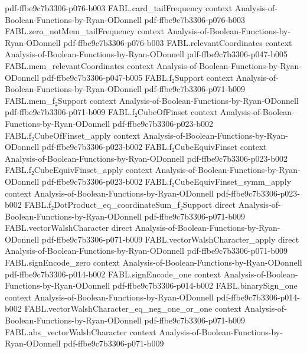 \begin{theorem}
  {pdf-ffbe9c7b3306-p076-b003}
\proofstep
  {FABL.card_tailFrequency}
  {context}
  {Analysis-of-Boolean-Functions-by-Ryan-ODonnell}
  {pdf-ffbe9c7b3306-p076-b003}
\proofstep
  {FABL.zero_notMem_tailFrequency}
  {context}
  {Analysis-of-Boolean-Functions-by-Ryan-ODonnell}
  {pdf-ffbe9c7b3306-p076-b003}
\proofstep
  {FABL.relevantCoordinates}
  {context}
  {Analysis-of-Boolean-Functions-by-Ryan-ODonnell}
  {pdf-ffbe9c7b3306-p047-b005}
\proofstep
  {FABL.mem_relevantCoordinates}
  {context}
  {Analysis-of-Boolean-Functions-by-Ryan-ODonnell}
  {pdf-ffbe9c7b3306-p047-b005}
\proofstep
  {FABL.f₂Support}
  {context}
  {Analysis-of-Boolean-Functions-by-Ryan-ODonnell}
  {pdf-ffbe9c7b3306-p071-b009}
\proofstep
  {FABL.mem_f₂Support}
  {context}
  {Analysis-of-Boolean-Functions-by-Ryan-ODonnell}
  {pdf-ffbe9c7b3306-p071-b009}
\proofstep
  {FABL.f₂CubeOfFinset}
  {context}
  {Analysis-of-Boolean-Functions-by-Ryan-ODonnell}
  {pdf-ffbe9c7b3306-p023-b002}
\proofstep
  {FABL.f₂CubeOfFinset_apply}
  {context}
  {Analysis-of-Boolean-Functions-by-Ryan-ODonnell}
  {pdf-ffbe9c7b3306-p023-b002}
\proofstep
  {FABL.f₂CubeEquivFinset}
  {context}
  {Analysis-of-Boolean-Functions-by-Ryan-ODonnell}
  {pdf-ffbe9c7b3306-p023-b002}
\proofstep
  {FABL.f₂CubeEquivFinset_apply}
  {context}
  {Analysis-of-Boolean-Functions-by-Ryan-ODonnell}
  {pdf-ffbe9c7b3306-p023-b002}
\proofstep
  {FABL.f₂CubeEquivFinset_symm_apply}
  {context}
  {Analysis-of-Boolean-Functions-by-Ryan-ODonnell}
  {pdf-ffbe9c7b3306-p023-b002}
\proofstep
  {FABL.f₂DotProduct_eq_coordinateSum_f₂Support}
  {direct}
  {Analysis-of-Boolean-Functions-by-Ryan-ODonnell}
  {pdf-ffbe9c7b3306-p071-b009}
\proofstep
  {FABL.vectorWalshCharacter}
  {direct}
  {Analysis-of-Boolean-Functions-by-Ryan-ODonnell}
  {pdf-ffbe9c7b3306-p071-b009}
\proofstep
  {FABL.vectorWalshCharacter_apply}
  {direct}
  {Analysis-of-Boolean-Functions-by-Ryan-ODonnell}
  {pdf-ffbe9c7b3306-p071-b009}
\proofstep
  {FABL.signEncode_zero}
  {context}
  {Analysis-of-Boolean-Functions-by-Ryan-ODonnell}
  {pdf-ffbe9c7b3306-p014-b002}
\proofstep
  {FABL.signEncode_one}
  {context}
  {Analysis-of-Boolean-Functions-by-Ryan-ODonnell}
  {pdf-ffbe9c7b3306-p014-b002}
\proofstep
  {FABL.binarySign_one}
  {context}
  {Analysis-of-Boolean-Functions-by-Ryan-ODonnell}
  {pdf-ffbe9c7b3306-p014-b002}
\proofstep
  {FABL.vectorWalshCharacter_eq_neg_one_or_one}
  {context}
  {Analysis-of-Boolean-Functions-by-Ryan-ODonnell}
  {pdf-ffbe9c7b3306-p071-b009}
\proofstep
  {FABL.abs_vectorWalshCharacter}
  {context}
  {Analysis-of-Boolean-Functions-by-Ryan-ODonnell}
  {pdf-ffbe9c7b3306-p071-b009}

\end{theorem}
